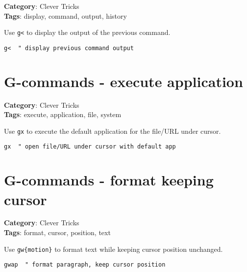 {{\textbf{Category}: Clever Tricks\\ \textbf{Tags}: display, command, output, history
\vspace{0.5cm}

Use {\footnotesize \Verb§g<§} to display the output of the previous command.

\begin{Exa*}{}
\begin{Verbatim}[fontsize=\footnotesize, breaklines, breakanywhere]
g<  " display previous command output
\end{Verbatim}
\end{Exa*}

\section{G-commands - execute application}

\textbf{Category}: Clever Tricks\\ \textbf{Tags}: execute, application, file, system
\vspace{0.5cm}

Use {\footnotesize \Verb§gx§} to execute the default application for the file/URL under cursor.

\begin{Exa*}{}
\begin{Verbatim}[fontsize=\footnotesize, breaklines, breakanywhere]
gx  " open file/URL under cursor with default app
\end{Verbatim}
\end{Exa*}

\section{G-commands - format keeping cursor}

\textbf{Category}: Clever Tricks\\ \textbf{Tags}: format, cursor, position, text
\vspace{0.5cm}

Use {\footnotesize \Verb§gw{motion}§} to format text while keeping cursor position unchanged.

\begin{Exa*}{}
\begin{Verbatim}[fontsize=\footnotesize, breaklines, breakanywhere]
gwap  " format paragraph, keep cursor position
\end{Verbatim}
\end{Exa*}

}}

